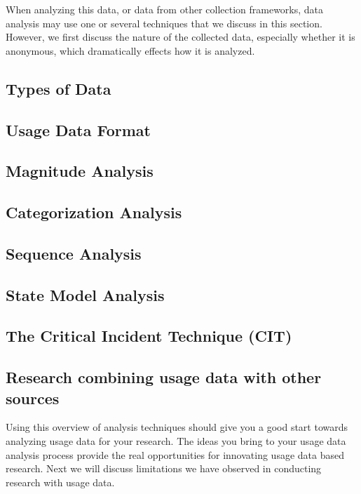 When analyzing this data, or data from other collection frameworks, data analysis may use one or several techniques that we discuss in this section. However, we first discuss the nature of the collected data, especially whether it is anonymous, which dramatically effects how it is analyzed.

\subsection{Types of Data}


\subsection{Usage Data Format}


\subsection{Magnitude Analysis}


\subsection{Categorization Analysis}


\subsection{Sequence Analysis}


\subsection{State Model Analysis}


\subsection{The Critical Incident Technique (CIT)}


\subsection{Research combining usage data with other sources}


\vspace{0.1in}
Using this overview of analysis techniques should give you a good start towards analyzing usage data for your research.
The ideas you bring to your usage data analysis process provide the real opportunities for innovating usage data based research.  Next we will discuss limitations we have observed in conducting research with usage data.

